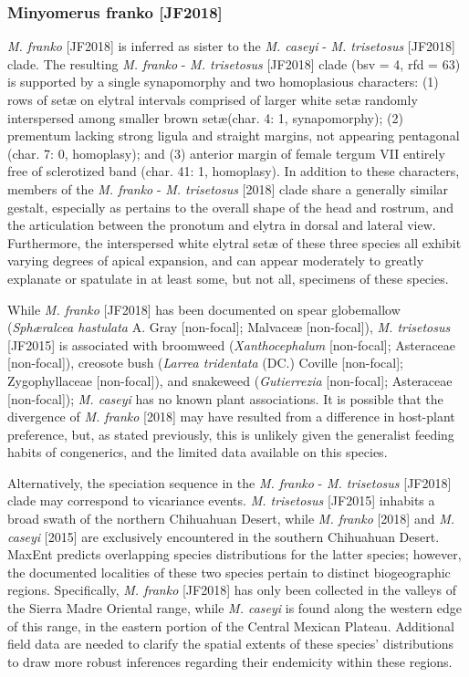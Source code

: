 \documentclass[fleqn,10pt,lineno]{wlpeerj} %
\begin{document}
		\subsubsection*{Minyomerus franko \textnormal{\bfseries[JF2018]}}
			\textit{M. franko} [JF2018] is inferred as sister to the \textit{M. caseyi} - \textit{M. trisetosus} [JF2018] clade.
			The resulting \textit{M. franko} - \textit{M. trisetosus} [JF2018] clade (bsv = 4, rfd = 63) is supported by a single synapomorphy and two homoplasious characters: (1) rows of set{\ae} on elytral intervals comprised of larger white set{\ae} randomly interspersed among smaller brown set{\ae}(char. 4: 1, synapomorphy); (2) prementum lacking strong ligula and straight margins, not appearing pentagonal (char. 7: 0, homoplasy); and (3) anterior margin of female tergum VII entirely free of sclerotized band (char. 41: 1, homoplasy).
			In addition to these characters, members of the \textit{M. franko} - \textit{M. trisetosus} [2018] clade share a generally similar gestalt, especially as pertains to the overall shape of the head and rostrum, and the articulation between the pronotum and elytra in dorsal and lateral view.
			Furthermore, the interspersed white elytral set{\ae} of these three species all exhibit varying degrees of apical expansion, and can appear moderately to greatly explanate or spatulate in at least some, but not all, specimens of these species.
			
			While \textit{M. franko} [JF2018] has been documented on spear globemallow (\textit{Sph{\ae}ralcea hastulata} A. Gray [non-focal]; Malvace{\ae} [non-focal]), \textit{M. trisetosus} [JF2015] is associated with broomweed (\textit{Xanthocephalum} [non-focal]; Asteraceae [non-focal]), creosote bush (\textit{Larrea tridentata} (DC.) Coville [non-focal]; Zygophyllaceae [non-focal]), and snakeweed (\textit{Gutierrezia} [non-focal]; Asteraceae [non-focal]); \textit{M. caseyi} has no known plant associations.
			It is possible that the divergence of \textit{M. franko} [2018] may have resulted from a difference in host-plant preference, but, as stated previously, this is unlikely given the generalist feeding habits of congenerics, and the limited data available on this species.
			
			Alternatively, the speciation sequence in the \textit{M. franko} - \textit{M. trisetosus} [JF2018] clade may correspond to vicariance events.
			\textit{M. trisetosus} [JF2015] inhabits a broad swath of the northern Chihuahuan Desert, while \textit{M. franko} [2018] and \textit{M. caseyi} [2015] are exclusively encountered in the southern Chihuahuan Desert.
			MaxEnt predicts overlapping species distributions for the latter species; however, the documented localities of these two species pertain to distinct biogeographic regions.
			Specifically, \textit{M. franko} [JF2018] has only been collected in the valleys of the Sierra Madre Oriental range, while \textit{M. caseyi} is found along the western edge of this range, in the eastern portion of the Central Mexican Plateau.
			Additional field data are needed to clarify the spatial extents of these species' distributions to draw more robust inferences regarding their endemicity within these regions.
			
\end{document}
